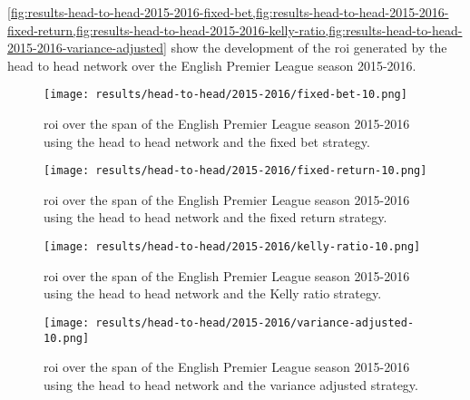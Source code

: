 \cref{fig:results-head-to-head-2015-2016-fixed-bet,fig:results-head-to-head-2015-2016-fixed-return,fig:results-head-to-head-2015-2016-kelly-ratio,fig:results-head-to-head-2015-2016-variance-adjusted} show the development of the \gls{roi} generated by the head to head network over the English Premier League season 2015-2016.
\begin{figure}
    \centering
    \texttt{[image: results/head-to-head/2015-2016/fixed-bet-10.png]}
    \caption{\gls{roi} over the span of the English Premier League season 2015-2016 using the head to head network and the fixed bet strategy.}
    \label{fig:results-head-to-head-2015-2016-fixed-bet}
\end{figure}
\begin{figure}
    \centering
    \texttt{[image: results/head-to-head/2015-2016/fixed-return-10.png]}
    \caption{\gls{roi} over the span of the English Premier League season 2015-2016 using the head to head network and the fixed return strategy.}
    \label{fig:results-head-to-head-2015-2016-fixed-return}
\end{figure}
\begin{figure}
    \centering
    \texttt{[image: results/head-to-head/2015-2016/kelly-ratio-10.png]}
    \caption{\gls{roi} over the span of the English Premier League season 2015-2016 using the head to head network and the Kelly ratio strategy.}
    \label{fig:results-head-to-head-2015-2016-kelly-ratio}
\end{figure}
\begin{figure}
    \centering
    \texttt{[image: results/head-to-head/2015-2016/variance-adjusted-10.png]}
    \caption{\gls{roi} over the span of the English Premier League season 2015-2016 using the head to head network and the variance adjusted strategy.}
    \label{fig:results-head-to-head-2015-2016-variance-adjusted}
\end{figure}

